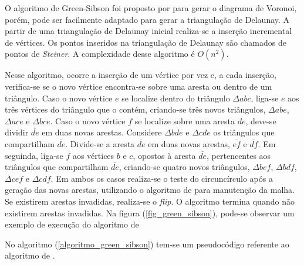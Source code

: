 O algoritmo de Green-Sibson foi proposto por  para gerar o diagrama de Voronoi, porém, pode ser facilmente adaptado para gerar a triangulação de Delaunay. A partir de uma triangulação de Delaunay inicial realiza-se a inserção incremental de vértices.  Os pontos inseridos na triangulação de Delaunay são chamados de pontos de {\it  Steiner}. A complexidade desse algoritmo é $O(n^2)$.

Nesse algoritmo, ocorre a inserção de um vértice por vez e, a cada inserção, verifica-se se o novo vértice encontra-se sobre uma aresta ou dentro de um triângulo. Caso o novo vértice $e$ se localize dentro do triângulo $\Delta abc$, liga-se $e$ aos três vértices do triângulo que o contém, criando-se três novos triângulos, $\Delta abe$, $\Delta ace$ e $\Delta bce$. Caso o novo vértice $f$ se localize sobre uma aresta $\overline{de}$, deve-se dividir $\overline{de}$ em duas novas arestas. Considere $\Delta bde$ e $\Delta cde$ os triângulos que compartilham $\overline{de}$. Divide-se a aresta $\overline{de}$ em duas novas arestas, $\overline{ef}$ e $\overline{df}$. Em seguinda, liga-se $f$ aos vértices $b$ e $c$, opostos à aresta $\overline{de}$, pertencentes aos triângulos que compartilham $\overline{de}$, criando-se quatro novos triângulos, $\Delta bef$, $\Delta bdf$, $\Delta cef$ e $\Delta cdf$. Em ambos os casos realiza-se o teste do circuncírculo após a geração das novas arestas, utilizando o algoritmo de  para manutenção da malha. Se existirem arestas invadidas, realiza-se o {\it flip}. O algoritmo termina quando não existirem arestas invadidas. Na figura (\ref{fig_green_sibson}), pode-se observar um exemplo de execução do algoritmo de  

No algoritmo (\ref{algoritmo_green_sibson}) tem-se um pseudocódigo referente ao algoritmo de .

